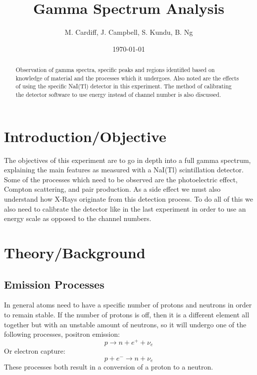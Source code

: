 \documentclass[letterpaper,12pt]{article}
\begin{document}
\title{Gamma Spectrum Analysis}
\author{M. Cardiff, J. Campbell, S. Kundu, B. Ng}
\date{\today}
\maketitle

\begin{abstract}
  Observation of gamma spectra, specific peaks and regions identified based on knowledge of material and the processes which it undergoes. Also noted are the effects of using the specific NaI(Tl) detector in this experiment. The method of calibrating the detector software to use energy instead of channel number is also discussed. 
\end{abstract}
\section{Introduction/Objective}
The objectives of this experiment are to go in depth into a full gamma spectrum, explaining the main features as measured with a NaI(Tl) scintillation detector. Some of the processes which need to be observed are the photoelectric effect, Compton scattering, and pair production. As a side effect we must also understand how X-Rays originate from this detection process. To do all of this we also need to calibrate the detector like in the last experiment in order to use an energy scale as opposed to the channel numbers.
\section{Theory/Background}

\subsection{Emission Processes}
In general atoms need to have a specific number of protons and neutrons in order to remain stable. If the number of protons is off, then it is a different element all together but with an unstable amount of neutrons, so it will undergo one of the following processes, positron emission:
\begin{equation}
  \label{eq:pe}
  p\to n+e^++\nu_e
\end{equation}
Or electron capture:
\begin{equation}
  \label{eq:ec}
  p+e^-\to n+\nu_e
\end{equation}
These processes both result in a conversion of a proton to a neutron.
\end{document}
